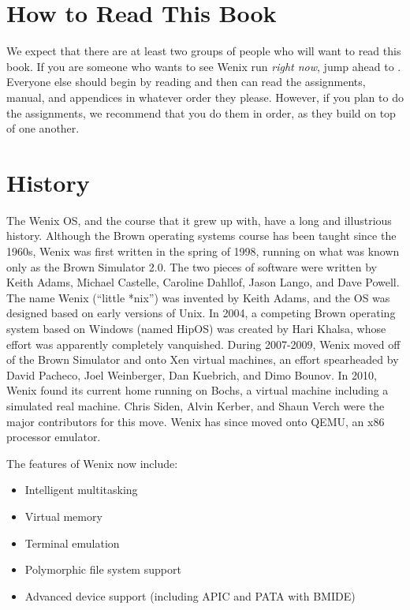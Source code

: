 \section{How to Read This Book}
We expect that there are at least two groups of people who will want to read this book. If you are someone who wants to see Wenix run \emph{right now}, jump ahead to . Everyone else should begin by reading  and then can read the assignments, manual, and appendices in whatever order they please. However, if you plan to do the assignments, we recommend that you do them in order, as they build on top of one another.

\section{History}
The Wenix OS, and the course that it grew up with, have a long and illustrious history. Although the Brown operating systems course has been taught since the 1960s, Wenix was first written in the spring of 1998, running on what was known only as the Brown Simulator 2.0. The two pieces of software were written by Keith Adams, Michael Castelle, Caroline Dahllof, Jason Lango, and Dave Powell. The name Wenix (``little *nix'') was invented by Keith Adams, and the OS was designed based on early versions of Unix. In 2004, a competing Brown operating system based on Windows (named HipOS) was created by Hari Khalsa, whose effort was apparently completely vanquished. During 2007-2009, Wenix moved off of the Brown Simulator and onto Xen virtual machines, an effort spearheaded by David Pacheco, Joel Weinberger, Dan Kuebrich, and Dimo Bounov. In 2010, Wenix found its current home running on Bochs, a virtual machine including a simulated real machine. Chris Siden, Alvin Kerber, and Shaun Verch were the major contributors for this move. Wenix has since moved onto QEMU, an x86 processor emulator.

The features of Wenix now include:
\begin{itemize}
    \item Intelligent multitasking
    \item Virtual memory
    \item Terminal emulation
    \item Polymorphic file system support
    \item Advanced device support (including APIC and PATA with BMIDE)
\end{itemize}

